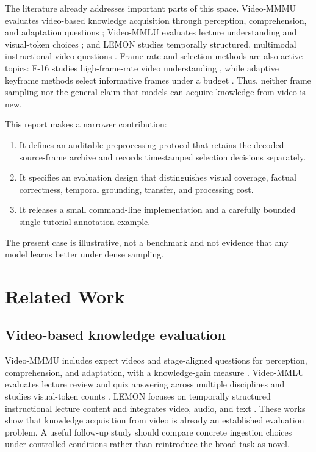 \documentclass[11pt]{article}
\begin{document}
The literature already addresses important parts of this space. Video-MMMU evaluates video-based knowledge acquisition through perception, comprehension, and adaptation questions \cite{videommmu}; Video-MMLU evaluates lecture understanding and visual-token choices \cite{videommlu}; and LEMON studies temporally structured, multimodal instructional video questions \cite{lemon}. Frame-rate and selection methods are also active topics: F-16 studies high-frame-rate video understanding \cite{f16}, while adaptive keyframe methods select informative frames under a budget \cite{aks,mllmselect}. Thus, neither frame sampling nor the general claim that models can acquire knowledge from video is new.

This report makes a narrower contribution:
\begin{enumerate}[leftmargin=1.5em]
  \item It defines an auditable preprocessing protocol that retains the decoded source-frame archive and records timestamped selection decisions separately.
  \item It specifies an evaluation design that distinguishes visual coverage, factual correctness, temporal grounding, transfer, and processing cost.
  \item It releases a small command-line implementation and a carefully bounded single-tutorial annotation example.
\end{enumerate}
The present case is illustrative, not a benchmark and not evidence that any model learns better under dense sampling.

\section{Related Work}
\subsection{Video-based knowledge evaluation}
Video-MMMU includes expert videos and stage-aligned questions for perception, comprehension, and adaptation, with a knowledge-gain measure \cite{videommmu}. Video-MMLU evaluates lecture review and quiz answering across multiple disciplines and studies visual-token counts \cite{videommlu}. LEMON focuses on temporally structured instructional lecture content and integrates video, audio, and text \cite{lemon}. These works show that knowledge acquisition from video is already an established evaluation problem. A useful follow-up study should compare concrete ingestion choices under controlled conditions rather than reintroduce the broad task as novel.
\end{document}

